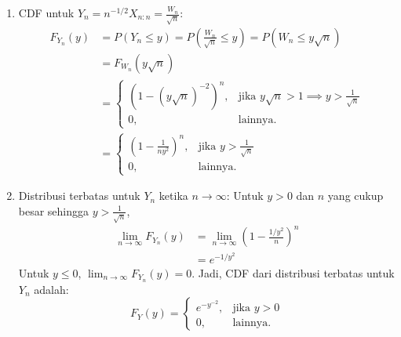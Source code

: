 \documentclass[11pt,letterpaper]{article}
\begin{document}
\begin{enumerate}
\begin{enumerate}[label=(\alph*)]
          \item CDF untuk $Y_n = n^{-1/2}X_{n:n} = \frac{W_n}{\sqrt{n}}$:
                \begin{align*}
                  F_{Y_n}(y) & = P(Y_n \le y) = P\left(\frac{W_n}{\sqrt{n}} \le y\right) = P(W_n \le y\sqrt{n})                      \\
                             & = F_{W_n}(y\sqrt{n})                                                                                  \\
                             & = \begin{cases}
                                   \left(1 - (y\sqrt{n})^{-2}\right)^n, & \text{jika } y\sqrt{n} > 1 \implies y > \frac{1}{\sqrt{n}} \\
                                   0,                                   & \text{lainnya.}
                                 \end{cases} \\
                             & = \begin{cases}
                                   \left(1 - \frac{1}{n y^2}\right)^n, & \text{jika } y > \frac{1}{\sqrt{n}} \\
                                   0,                                  & \text{lainnya.}
                                 \end{cases}
                \end{align*}

          \item Distribusi terbatas untuk $Y_n$ ketika $n \to \infty$:
                Untuk $y > 0$ dan $n$ yang cukup besar sehingga $y > \frac{1}{\sqrt{n}}$,
                \begin{align*}
                  \lim_{n \to \infty} F_{Y_n}(y) & = \lim_{n \to \infty} \left(1 - \frac{1/y^2}{n}\right)^n \\
                                                 & = e^{-1/y^2}
                \end{align*}
                Untuk $y \le 0$, $\lim_{n \to \infty} F_{Y_n}(y) = 0$.
                Jadi, CDF dari distribusi terbatas untuk $Y_n$ adalah:
                \[
                  F_Y(y) = \begin{cases}
                    e^{-y^{-2}}, & \text{jika } y > 0 \\
                    0,           & \text{lainnya.}
                  \end{cases}
                \]
        \end{enumerate}


\end{enumerate}
\end{document}
